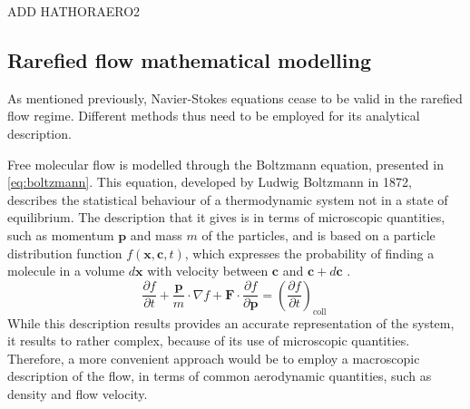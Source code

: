 ADD HATHORAERO2

\subsection{Rarefied flow mathematical modelling}
As mentioned previously, Navier-Stokes equations cease to be valid in the rarefied flow regime. Different methods thus need to be employed for its analytical description.

Free molecular flow is modelled through the Boltzmann equation, presented in \autoref{eq:boltzmann}. This equation, developed by Ludwig Boltzmann in 1872, describes the statistical behaviour of a thermodynamic system not in a state of equilibrium. The description that it gives is in terms of microscopic quantities, such as momentum $\mathbf{p}$ and mass $m$ of the particles, and is based on a particle distribution function $f (\mathbf{x}, \mathbf{c},t)$, which expresses the probability of finding a molecule in a volume $d\mathbf{x}$ with velocity between $\mathbf{c}$ and $\mathbf{c} + d \mathbf{c}$ \cite{burnett}.
\begin{equation}
    \frac{\partial f}{\partial t}+\frac{\mathbf{p}}{m} \cdot \nabla f+\mathbf{F} \cdot \frac{\partial f}{\partial \mathbf{p}}=\left(\frac{\partial f}{\partial t}\right)_{\text {coll }}
    \label{eq:boltzmann}
\end{equation}
While this description results provides an accurate representation of the system, it results to rather complex, because of its use of microscopic quantities. Therefore, a more convenient approach would be to employ a macroscopic description of the flow, in terms of common aerodynamic quantities, such as density and flow velocity.

